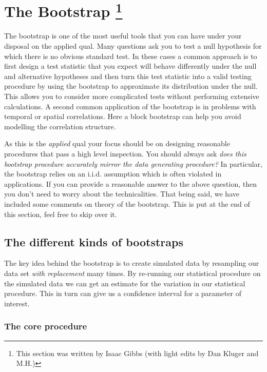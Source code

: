 \section{The Bootstrap \footnote{This section was written by Isaac Gibbs (with light edits by Dan Kluger and M.H.)}}

The bootstrap is one of the most useful tools that you can have under your disposal on the applied qual. Many questions ask you to test a null hypothesis for which there is no obvious standard test. In these cases a common approach is to first design a test statistic that you expect will behave differently under the null and alternative hypotheses and then turn this test statistic into a valid testing procedure by using the bootstrap to approximate its distribution under the null. This allows you to consider more complicated tests without performing extensive calculations. A second common application of the bootstrap is in problems with temporal or spatial correlations. Here a block bootstrap can help you  avoid modelling the correlation structure.

As this is the \textit{applied} qual your focus should be on designing reasonable procedures that pass a high level inspection. You should always ask \textit{does this bootstrap procedure accurately mirror the data generating procedure?} In particular, the bootstrap relies on an i.i.d. assumption which is often violated in applications. If you can provide a reasonable answer to the above question, then you don't need to worry about the technicalities. That being said, we have included some comments on theory of the bootstrap. This is put at the end of this section, feel free to skip over it.

\subsection{The different kinds of bootstraps}

The key idea behind the bootstrap is to create simulated data by resampling our data set \emph{with replacement} many times. By re-running our statistical procedure on the simulated data we can get an estimate for the variation in our statistical procedure. This in turn can give us a confidence interval for a parameter of interest. 


\subsubsection*{The core procedure}\label{sec:the_standard_bootstrap}


